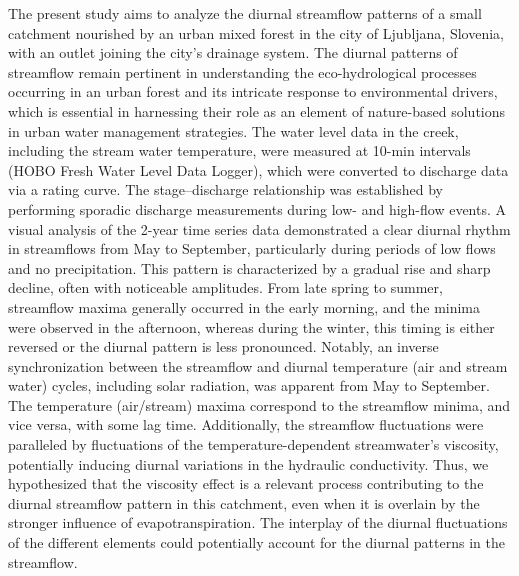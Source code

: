 \noindent

The present study aims to analyze the diurnal streamflow patterns of a small catchment nourished by an urban mixed forest in the city of Ljubljana, Slovenia, with an outlet joining the city’s drainage system. The diurnal patterns of streamflow remain pertinent in understanding the eco-hydrological processes occurring in an urban forest and its intricate response to environmental drivers, which is essential in harnessing their role as an element of nature-based solutions in urban water management strategies. The water level data in the creek, including the stream water temperature, were measured at 10-min intervals (HOBO Fresh Water Level Data Logger), which were converted to discharge data via a rating curve. The stage–discharge relationship was established by performing sporadic discharge measurements during low- and high-flow events. A visual analysis of the 2-year time series data demonstrated a clear diurnal rhythm in streamflows from May to September, particularly during periods of low flows and no precipitation. This pattern is characterized by a gradual rise and sharp decline, often with noticeable amplitudes. From late spring to summer, streamflow maxima generally occurred in the early morning, and the minima were observed in the afternoon, whereas during the winter, this timing is either reversed or the diurnal pattern is less pronounced. Notably, an inverse synchronization between the streamflow and diurnal temperature (air and stream water) cycles, including solar radiation, was apparent from May to September. The temperature (air/stream) maxima correspond to the streamflow minima, and vice versa, with some lag time. Additionally, the streamflow fluctuations were paralleled by fluctuations of the temperature-dependent streamwater’s viscosity, potentially inducing diurnal variations in the hydraulic conductivity. Thus, we hypothesized that the viscosity effect is a relevant process contributing to the diurnal streamflow pattern in this catchment, even when it is overlain by the stronger influence of evapotranspiration. The interplay of the diurnal fluctuations of the different elements could potentially account for the diurnal patterns in the streamflow.

